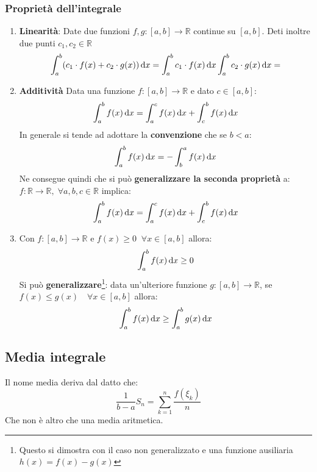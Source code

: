 \subsubsection{Proprietà dell'integrale}
\begin{enumerate}
	\item \textbf{Linearità}: Date due funzioni $f,g:[a,b] \to \mathbb{R}$ continue su $[a,b]$. Deti inoltre due punti $c_1, c_2 \in \mathbb{R}$
		\begin{equation*}
			\int_a^b (c_1 \cdot f(x) + c_2 \cdot g(x)) \,\text{d} x = \int_a^b c_1 \cdot f(x) \,\text{d} x \int_a^b c_2 \cdot g(x) \,\text{d} x = 
		\end{equation*}

	\item \textbf{Additività} Data una funzione $f:[a,b] \to \mathbb{R}$ e dato $c \in [a,b]$:
		\begin{equation*}
			\int_a^b f(x) \,\text{d} x = \int_a^c f(x) \,\text{d} x + \int_c^b f(x) \,\text{d} x
		\end{equation*}
		In generale si tende ad adottare la \textbf{convenzione} che se $b < a$:
		\begin{equation*}
			\int_a^b f(x) \,\text{d} x = -\int_b^a f(x) \,\text{d} x
		\end{equation*}
		Ne consegue quindi che si può \textbf{generalizzare la seconda proprietà} a: $f:\mathbb{R} \to \mathbb{R},\; \forall a,b,c \in \mathbb{R}$ implica:
		\begin{equation*}
			\int_a^b f(x) \,\text{d} x = \int_a^c f(x) \,\text{d} x + \int_c^b f(x) \,\text{d} x 
		\end{equation*}

	\item Con $f:[a,b] \to \mathbb{R}$ e $f(x) \geq 0 \;\; \forall x \in [a,b]$ allora:
		\begin{equation*}
			\int_a^b f(x) \,\text{d} x \geq 0
		\end{equation*}
		Si può \textbf{generalizzare}\footnote{Questo si dimostra con il caso non generalizzato e una funzione ausiliaria $h(x) = f(x) - g(x)$}: data un'ulteriore funzione $g:[a,b] \to \mathbb{R}$, se $f(x) \leq g(x) \quad \forall x \in [a,b]$ allora:
		\begin{equation*}
			\int_a^b f(x) \,\text{d} x \geq \int_a^b g(x) \,\text{d} x
		\end{equation*}
\end{enumerate}

\subsection{Media integrale}
Il nome media deriva dal datto che:
\begin{equation*}
	\dfrac{1}{b-a} S_n = \sum \limits_{k = 1}^n \dfrac{f(\xi_k)}{n}
\end{equation*}
Che non è altro che una media aritmetica.

